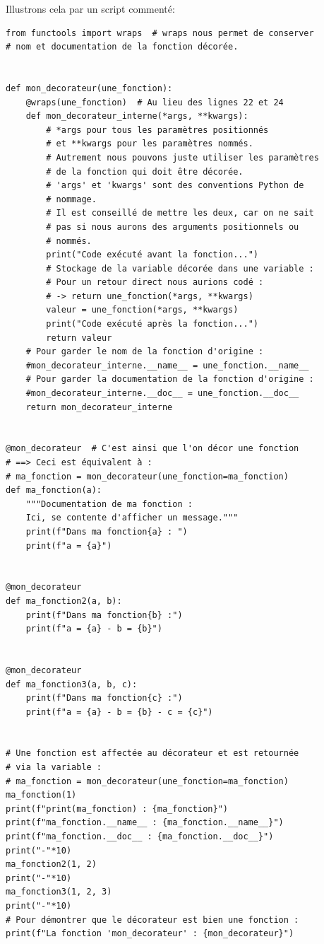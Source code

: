 \documentclass[a4paper,12pt]{book}
\begin{document}
Illustrons cela par un script commenté:
\begin{lstlisting}[caption=Fonction avec décorateur]
from functools import wraps  # wraps nous permet de conserver 
# nom et documentation de la fonction décorée.


def mon_decorateur(une_fonction):
    @wraps(une_fonction)  # Au lieu des lignes 22 et 24
    def mon_decorateur_interne(*args, **kwargs):
        # *args pour tous les paramètres positionnés
        # et **kwargs pour les paramètres nommés.
        # Autrement nous pouvons juste utiliser les paramètres  
        # de la fonction qui doit être décorée.
        # 'args' et 'kwargs' sont des conventions Python de 
        # nommage.
        # Il est conseillé de mettre les deux, car on ne sait 
        # pas si nous aurons des arguments positionnels ou 
        # nommés.
        print("Code exécuté avant la fonction...")
        # Stockage de la variable décorée dans une variable :
        # Pour un retour direct nous aurions codé :
        # -> return une_fonction(*args, **kwargs)
        valeur = une_fonction(*args, **kwargs)
        print("Code exécuté après la fonction...")
        return valeur
    # Pour garder le nom de la fonction d'origine :
    #mon_decorateur_interne.__name__ = une_fonction.__name__
    # Pour garder la documentation de la fonction d'origine :
    #mon_decorateur_interne.__doc__ = une_fonction.__doc__
    return mon_decorateur_interne


@mon_decorateur  # C'est ainsi que l'on décor une fonction
# ==> Ceci est équivalent à :
# ma_fonction = mon_decorateur(une_fonction=ma_fonction)
def ma_fonction(a):
    """Documentation de ma fonction :
    Ici, se contente d'afficher un message."""
    print(f"Dans ma fonction{a} : ")
    print(f"a = {a}")


@mon_decorateur
def ma_fonction2(a, b):
    print(f"Dans ma fonction{b} :")
    print(f"a = {a} - b = {b}")


@mon_decorateur
def ma_fonction3(a, b, c):
    print(f"Dans ma fonction{c} :")
    print(f"a = {a} - b = {b} - c = {c}")


# Une fonction est affectée au décorateur et est retournée 
# via la variable :
# ma_fonction = mon_decorateur(une_fonction=ma_fonction)
ma_fonction(1)
print(f"print(ma_fonction) : {ma_fonction}")
print(f"ma_fonction.__name__ : {ma_fonction.__name__}")
print(f"ma_fonction.__doc__ : {ma_fonction.__doc__}")
print("-"*10)
ma_fonction2(1, 2)
print("-"*10)
ma_fonction3(1, 2, 3)
print("-"*10)
# Pour démontrer que le décorateur est bien une fonction :
print(f"La fonction 'mon_decorateur' : {mon_decorateur}")
\end{lstlisting}
\medskip
\end{document}
